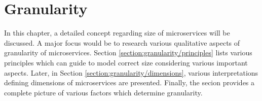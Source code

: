 \chapter{Granularity}\label{chapter:granularity}
In this chapter, a detailed concept regarding size of microservices will be discussed. A major focus would be to research various qualitative aspects of granularity of microservices. Section \ref{section:granularity/principles} lists various principles which can guide to model correct size considering various important aspects. Later, in Section \ref{section:granularity/dimensions}, various interpretations defining dimensions of microservices are presented. Finally, the secion provides a complete picture of various factors which determine granularity.

